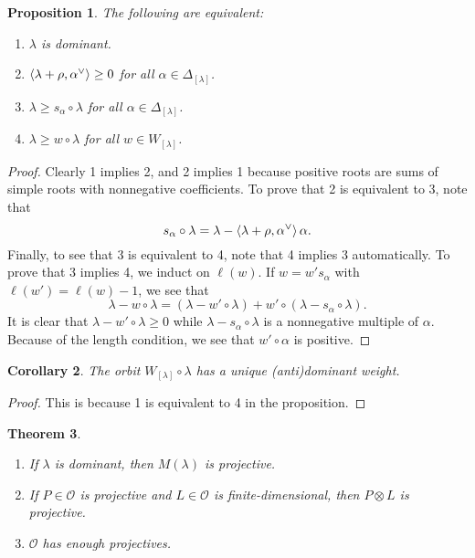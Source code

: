 \documentclass[leqno, openany]{memoir}
\newtheorem{thm}{Theorem}[section]
\newtheorem{cor}[thm]{Corollary}
\newtheorem{prop}[thm]{Proposition}
\theoremstyle{definition}
\theoremstyle{remark}
\theoremstyle{plain}
\theoremstyle{definition}
\theoremstyle{remark}
\newcommand{\cO}{\mathcal{O}}
\begin{document}
\begin{prop}
    The following are equivalent:
    \begin{enumerate}
        \item $\lambda$ is dominant.
        \item $\ev{\lambda + \rho, \alpha^{\vee}} \geq 0$ for all $\alpha \in \Delta_{[\lambda]}$.
        \item $\lambda \geq s_{\alpha} \circ \lambda$ for all $\alpha \in \Delta_{[\lambda]}$.
        \item $\lambda \geq w \circ \lambda$ for all $w \in W_{[\lambda]}$.
    \end{enumerate}
\end{prop}

\begin{proof}
    Clearly 1 implies 2, and 2 implies 1 because positive roots are sums of simple roots with nonnegative coefficients. To prove that 2 is equivalent to 3, note that
    \[ s_{\alpha} \circ \lambda = \lambda - \ev{\lambda + \rho, \alpha^{\vee}} \alpha. \]
    Finally, to see that 3 is equivalent to 4, note that 4 implies 3 automatically. To prove that 3 implies 4, we induct on $\ell(w)$. If $w = w' s_{\alpha}$ with $\ell(w') = \ell(w) - 1$, we see that
    \[ \lambda - w \circ \lambda = (\lambda - w' \circ \lambda) + w' \circ (\lambda - s_{\alpha} \circ \lambda). \]
    It is clear that $\lambda - w' \circ \lambda \geq 0$ while $\lambda - s_{\alpha} \circ \lambda$ is a nonnegative multiple of $\alpha$. Because of the length condition, we see that $w' \circ \alpha$ is positive.
\end{proof}

\begin{cor}
    The orbit $W_{[\lambda]} \circ \lambda$ has a unique (anti)dominant weight.
\end{cor}

\begin{proof}
    This is because 1 is equivalent to 4 in the proposition.
\end{proof}

\begin{thm}\leavevmode
    \begin{enumerate}
        \item If $\lambda$ is dominant, then $M(\lambda)$ is projective.
        \item If $P \in \cO$ is projective and $L \in \cO$ is finite-dimensional, then $P \otimes L$ is projective.
        \item $\cO$ has enough projectives.
    \end{enumerate}
\end{thm}
\end{document}
